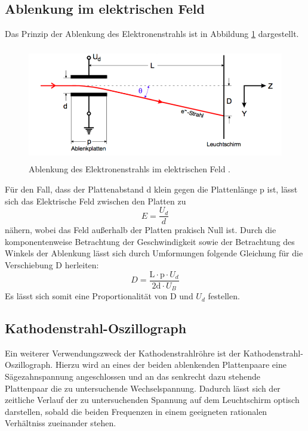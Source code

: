 \subsection{Ablenkung im elektrischen Feld}
Das Prinzip der Ablenkung des Elektronenstrahls ist in Abbildung \ref{fig:abl1}
dargestellt.
\begin{figure}[H]
  \centering
  \includegraphics[height=5cm]{Ablenkung.png}
  \caption{Ablenkung des Elektronenstrahls im elektrischen Feld \cite{skript1}.}
  \label{fig:abl1}
\end{figure}
Für den Fall, dass der Plattenabstand d klein gegen die Plattenlänge p ist,
lässt sich das Elektrische Feld zwischen den Platten zu
\begin{equation}
  E = \frac{U_d}{d}
  \label{eqn:efeld}
\end{equation}
nähern, wobei das Feld außerhalb der Platten prakisch Null ist.
Durch die komponentenweise Betrachtung der Geschwindigkeit sowie der Betrachtung
des Winkels der Ablenkung lässt sich durch Umformungen folgende Gleichung für
die Verschiebung D herleiten:
\begin{equation}
   D = \frac{\text{L} \cdot \text{p} \cdot U_d}{2\text{d} \cdot U_B}
   \label{eqn:verschiebung}
\end{equation}
Es lässt sich somit eine Proportionalität von D und $U_d$ festellen.

\subsection{Kathodenstrahl-Oszillograph}
Ein weiterer Verwendungszweck der Kathodenstrahlröhre ist der Kathodenstrahl-Oszillograph.
Hierzu wird an eines der beiden ablenkenden Plattenpaare eine Sägezahnspannung angeschlossen
und an das senkrecht dazu stehende Plattenpaar die zu untersuchende Wechselspannung.
Dadurch lässt sich der zeitliche Verlauf der zu untersuchenden Spannung auf
dem Leuchtschirm optisch darstellen, sobald die beiden Frequenzen in einem
geeigneten rationalen Verhältniss zueinander stehen.

